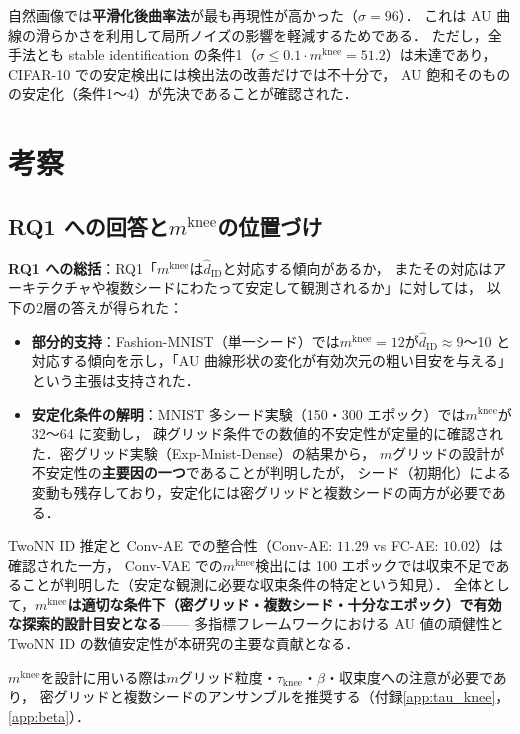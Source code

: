 \documentclass[11pt,a4paper]{jsarticle}
\newcommand{\mknee}{m^{\mathrm{knee}}}
\begin{document}
自然画像では\textbf{平滑化後曲率法}が最も再現性が高かった（$\sigma=96$）．
これは AU 曲線の滑らかさを利用して局所ノイズの影響を軽減するためである．
ただし，全手法とも stable identification の条件1（$\sigma \leq 0.1 \cdot \mknee = 51.2$）は未達であり，
CIFAR-10 での安定検出には検出法の改善だけでは不十分で，
AU 飽和そのものの安定化（条件1〜4）が先決であることが確認された．

\section{考察}\label{sec:discussion}

\subsection{RQ1 への回答と$\mknee$の位置づけ}\label{sec:disc_mknee}

\textbf{RQ1 への総括}：RQ1「$\mknee$は$\hat{d}_\mathrm{ID}$と対応する傾向があるか，
またその対応はアーキテクチャや複数シードにわたって安定して観測されるか」に対しては，
以下の2層の答えが得られた：

\begin{itemize}
  \item \textbf{部分的支持}：Fashion-MNIST（単一シード）では$\mknee = 12$が$\hat{d}_\mathrm{ID} \approx 9$〜10
        と対応する傾向を示し，「AU 曲線形状の変化が有効次元の粗い目安を与える」という主張は支持された．
  \item \textbf{安定化条件の解明}：MNIST 多シード実験（150・300 エポック）では$\mknee$が 32〜64 に変動し，
        疎グリッド条件での数値的不安定性が定量的に確認された．密グリッド実験（Exp-Mnist-Dense）の結果から，
        $m$グリッドの設計が不安定性の\textbf{主要因の一つ}であることが判明したが，
        シード（初期化）による変動も残存しており，安定化には密グリッドと複数シードの両方が必要である．
\end{itemize}

TwoNN ID 推定と Conv-AE での整合性（Conv-AE: $11.29$ vs FC-AE: $10.02$）は確認された一方，
Conv-VAE での$\mknee$検出には 100 エポックでは収束不足であることが判明した（安定な観測に必要な収束条件の特定という知見）．
全体として，\textbf{$\mknee$は適切な条件下（密グリッド・複数シード・十分なエポック）で有効な探索的設計目安となる}——
多指標フレームワークにおける AU 値の頑健性と TwoNN ID の数値安定性が本研究の主要な貢献となる．

$\mknee$を設計に用いる際は$m$グリッド粒度・$\tau_\mathrm{knee}$・$\beta$・収束度への注意が必要であり，
密グリッドと複数シードのアンサンブルを推奨する（付録\ref{app:tau_knee}，\ref{app:beta}）．
\end{document}
